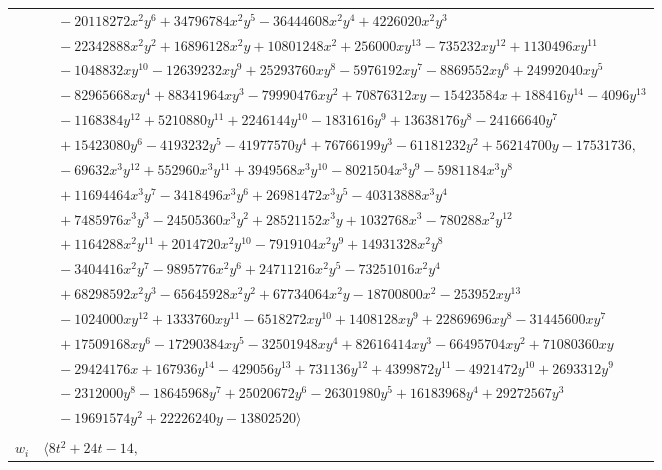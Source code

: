 \documentclass[11pt]{article}
\begin{document}
\begin{longtable}{@{}ll@{}}
 & $\quad -20118272x^{2}y^{6}+34796784x^{2}y^{5}-36444608x^{2}y^{4}+4226020x^{2}y^{3}$\\
 & $\quad -22342888x^{2}y^{2}+16896128x^{2}y+10801248x^{2}+256000xy^{13}-735232xy^{12}+1130496xy^{11}$\\
 & $\quad -1048832xy^{10}-12639232xy^{9}+25293760xy^{8}-5976192xy^{7}-8869552xy^{6}+24992040xy^{5}$\\
 & $\quad -82965668xy^{4}+88341964xy^{3}-79990476xy^{2}+70876312xy-15423584x+188416y^{14}-4096y^{13}$\\
 & $\quad -1168384y^{12}+5210880y^{11}+2246144y^{10}-1831616y^{9}+13638176y^{8}-24166640y^{7}$\\
 & $\quad +15423080y^{6}-4193232y^{5}-41977570y^{4}+76766199y^{3}-61181232y^{2}+56214700y-17531736,$\\
 & $\quad -69632x^{3}y^{12}+552960x^{3}y^{11}+3949568x^{3}y^{10}-8021504x^{3}y^{9}-5981184x^{3}y^{8}$\\
 & $\quad +11694464x^{3}y^{7}-3418496x^{3}y^{6}+26981472x^{3}y^{5}-40313888x^{3}y^{4}$\\
 & $\quad +7485976x^{3}y^{3}-24505360x^{3}y^{2}+28521152x^{3}y+1032768x^{3}-780288x^{2}y^{12}$\\
 & $\quad +1164288x^{2}y^{11}+2014720x^{2}y^{10}-7919104x^{2}y^{9}+14931328x^{2}y^{8}$\\
 & $\quad -3404416x^{2}y^{7}-9895776x^{2}y^{6}+24711216x^{2}y^{5}-73251016x^{2}y^{4}$\\
 & $\quad +68298592x^{2}y^{3}-65645928x^{2}y^{2}+67734064x^{2}y-18700800x^{2}-253952xy^{13}$\\
 & $\quad -1024000xy^{12}+1333760xy^{11}-6518272xy^{10}+1408128xy^{9}+22869696xy^{8}-31445600xy^{7}$\\
 & $\quad +17509168xy^{6}-17290384xy^{5}-32501948xy^{4}+82616414xy^{3}-66495704xy^{2}+71080360xy$\\
 & $\quad -29424176x+167936y^{14}-429056y^{13}+731136y^{12}+4399872y^{11}-4921472y^{10}+2693312y^{9}$\\
 & $\quad -2312000y^{8}-18645968y^{7}+25020672y^{6}-26301980y^{5}+16183968y^{4}+29272567y^{3}$\\
 & $\quad -19691574y^{2}+22226240y-13802520\rangle$\\
\addlinespace[2pt]
\multicolumn{2}{@{}p{0.97\textwidth}@{}}{$i=72$, $D_i=2$, $\rho_{ij}$: $3{:}1, \allowbreak 4{:}1, \allowbreak 20{:}1, \allowbreak 24{:}1, \allowbreak 45{:}1, \allowbreak 51{:}2$}\\
$w_i$ & $\langle 8t^{2}+24t-14,$\\

\end{longtable}
\end{document}
